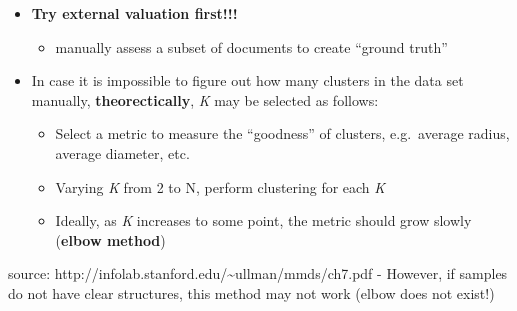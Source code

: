\documentclass[11pt]{article}
\providecommand{\tightlist}{%
      \setlength{\itemsep}{0pt}\setlength{\parskip}{0pt}}
\begin{document}
\begin{itemize}
\tightlist
\item
  \textbf{Try external valuation first!!!}

  \begin{itemize}
  \tightlist
  \item
    manually assess a subset of documents to create ``ground truth''
  \end{itemize}
\item
  In case it is impossible to figure out how many clusters in the data
  set manually, \textbf{theorectically}, \emph{K} may be selected as
  follows:

  \begin{itemize}
  \tightlist
  \item
    Select a metric to measure the ``goodness'' of clusters,
    e.g.~average radius, average diameter, etc.
  \item
    Varying \emph{K} from 2 to N, perform clustering for each \emph{K}
  \item
    Ideally, as \emph{K} increases to some point, the metric should grow
    slowly (\textbf{elbow method})
  \end{itemize}
\end{itemize}

 source:
http://infolab.stanford.edu/\textasciitilde{}ullman/mmds/ch7.pdf -
However, if samples do not have clear structures, this method may not
work (elbow does not exist!) 


    
    
    
    
\end{document}
